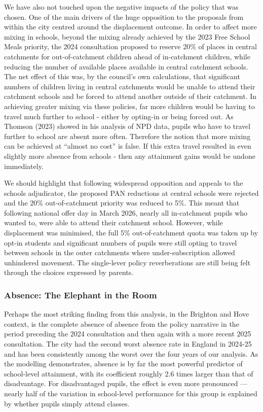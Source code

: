 \documentclass[
  11pt,
]{article}
\begin{document}
We have also not touched upon the negative impacts of the policy that
was chosen. One of the main drivers of the huge opposition to the
proposals from within the city centred around the displacement outcome.
In order to affect more mixing in schools, beyond the mixing already
achieved by the 2023 Free School Meals priority, the 2024 consultation
proposed to reserve 20\% of places in central catchments for
out-of-catchment children ahead of in-catchment children, while reducing
the number of available places available in central catchment schools.
The net effect of this was, by the council's own calculations, that
significant numbers of children living in central catchments would be
unable to attend their catchment schools and be forced to attend another
outside of their catchment. In achieving greater mixing via these
policies, far more children would be having to travel much further to
school - either by opting-in or being forced out. As Thomson (2023)
showed in his analysis of NPD data, pupils who have to travel further to
school are absent more often. Therefore the notion that more mixing can
be achieved at ``almost no cost'' is false. If this extra travel
resulted in even slightly more absence from schools - then any
attainment gains would be undone immediately.

We should highlight that following widespread opposition and appeals to
the schools adjudicator, the proposed PAN reductions at central schools
were rejected and the 20\% out-of-catchment priority was reduced to 5\%.
This meant that following national offer day in March 2026, nearly all
in-catchment pupils who wanted to, were able to attend their catchment
school. However, while displacement was minimised, the full 5\%
out-of-catchment quota was taken up by opt-in students and significant
numbers of pupils were still opting to travel between schools in the
outer catchments where under-subscription allowed unhindered movement.
The single-lever policy reverberations are still being felt through the
choices expressed by parents.

\subsubsection{Absence: The Elephant in the
Room}\label{absence-the-elephant-in-the-room}

Perhaps the most striking finding from this analysis, in the Brighton
and Hove context, is the complete absence of absence from the policy
narrative in the period preceding the 2024 consultation and then again
with a more recent 2025 consultation. The city had the second worst
absence rate in England in 2024-25 and has been consistently among the
worst over the four years of our analysis. As the modelling
demonstrates, absence is by far the most powerful predictor of
school-level attainment, with its coefficient roughly 2.6 times larger
than that of disadvantage. For disadvantaged pupils, the effect is even
more pronounced --- nearly half of the variation in school-level
performance for this group is explained by whether pupils simply attend
classes.
\end{document}
